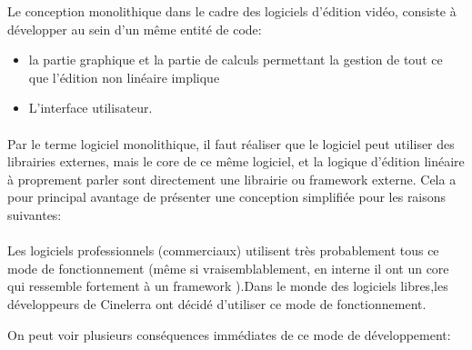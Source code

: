 Le conception monolithique  dans le cadre des
logiciels d'édition vidéo, consiste à développer au sein d'un même
entité de code:

\begin{itemize} \setlength{\itemsep}{2mm}

  \item {la partie graphique et la partie de calculs
    permettant la gestion de tout ce que l'édition non linéaire
    implique}

  \item {L'interface utilisateur.}

\end {itemize}

\paragraph{}

Par le terme logiciel monolithique, il faut réaliser
que le logiciel peut utiliser des librairies externes, mais le core de
ce même logiciel, et la logique d'édition linéaire à proprement
parler sont directement %
une librairie ou framework  externe. Cela a pour
principal avantage de présenter une conception simplifiée pour les
raisons suivantes:

\paragraph{}

Les logiciels professionnels (commerciaux) utilisent très probablement
tous ce mode de fonctionnement (même si vraisemblablement, en interne il ont
un core qui ressemble fortement à un framework ).Dans
le monde des logiciels libres,les développeurs de Cinelerra ont décidé
d'utiliser ce mode de fonctionnement.

On peut voir plusieurs conséquences immédiates de ce mode de
développement:

